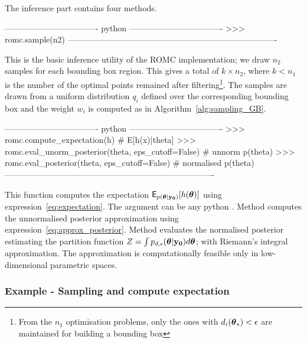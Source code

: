 The inference part contains four methods.

\begin{Code}
---------------------------------- python ----------------------------------
>>> romc.sample(n2)
----------------------------------------------------------------------------
\end{Code}

\noindent
This is the basic inference utility of the ROMC implementation; we
draw \(n_2\) samples for each bounding box region. This gives a total of
\(k \times n_2\), where \(k < n_1\) is the number of the optimal points
remained after filtering\footnote{From the \(n_1\) optimisation
  problems, only the ones with \(d_i(\boldsymbol{\theta}_*) < \epsilon\) are
  maintained for building a bounding box}. The samples are drawn from
a uniform distribution \(q_i\) defined over the corresponding bounding
box and the weight \(w_i\) is computed as in
Algorithm~\ref{alg:sampling_GB}.

\begin{Code}
---------------------------------- python ----------------------------------
>>> romc.compute_expectation(h) # E[h(x)|theta]
>>> romc.eval_unorm_posterior(theta, eps_cutoff=False) # unnorm p(theta)
>>> romc.eval_posterior(theta, eps_cutoff=False) # normalised p(theta)
----------------------------------------------------------------------------
\end{Code}

\noindent
This function computes the expectation
\(\mathsf{E}_{p(\boldsymbol{\theta}|\mathbf{y_0})}[h(\boldsymbol{\theta})]\) using
expression~\eqref{eq:expectation}. The argument  can be any
python . Method  computes the
unnormalised posterior approximation using
expression~\eqref{eq:approx_posterior}. Method 
evaluates the normalised posterior estimating the partition function
\(Z = \int p_{d,\epsilon}(\boldsymbol{\theta}|\mathbf{y_0})d\boldsymbol{\theta}\); with Riemann's
integral approximation. The approximation is computationally feasible
only in low-dimensional parametric spaces.

\subsubsection*{Example - Sampling and compute expectation}

